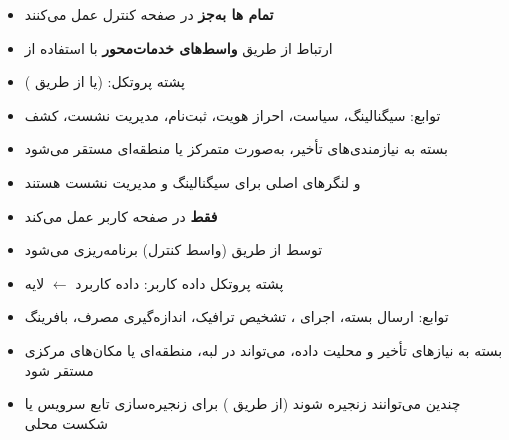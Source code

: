 \begin{itemize}
\tightlist
\item
  \textbf{تمام ها به‌جز } در صفحه کنترل عمل می‌کنند
\item
  ارتباط از طریق \textbf{واسط‌های خدمات‌محور } با استفاده از 
\item
  پشته پروتکل:  (یا از طریق )
\item
  توابع: سیگنالینگ، سیاست، احراز هویت، ثبت‌نام، مدیریت نشست، کشف
\item
  بسته به نیازمندی‌های تأخیر، به‌صورت متمرکز یا منطقه‌ای مستقر می‌شود
\item
   و  لنگرهای اصلی  برای سیگنالینگ  و مدیریت نشست هستند
\end{itemize}


\begin{itemize}
\tightlist
\item
  \textbf{فقط } در صفحه کاربر عمل می‌کند
\item
  توسط  از طریق  (واسط کنترل) برنامه‌ریزی می‌شود
\item
  پشته پروتکل داده کاربر: داده کاربرد \ensuremath{\leftarrow} لایه 
\item
  توابع: ارسال بسته، اجرای ، تشخیص ترافیک، اندازه‌گیری مصرف، بافرینگ
\item
  بسته به نیازهای تأخیر و محلیت داده، می‌تواند در لبه، منطقه‌ای یا مکان‌های مرکزی مستقر شود
\item
  چندین  می‌توانند زنجیره شوند (از طریق ) برای زنجیره‌سازی تابع سرویس یا شکست محلی
\end{itemize}






